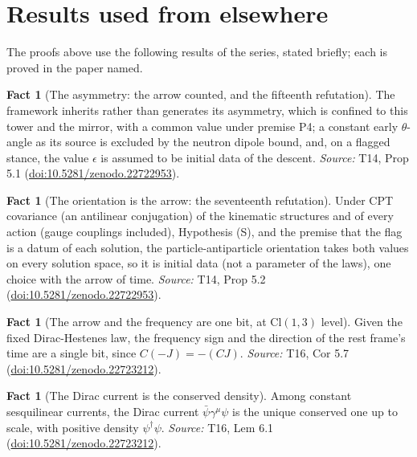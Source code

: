 \documentclass[11pt]{article}
\theoremstyle{definition}
\newtheorem{fact}[theorem]{Fact}
\theoremstyle{plain}
\providecommand{\Cl}{}\renewcommand{\Cl}{\mathrm{Cl}}
\begin{document}
\section{Results used from elsewhere}
The proofs above use the following results of the series, stated briefly; each is proved in the paper named.

\begin{fact}[The asymmetry: the arrow counted, and the fifteenth refutation]\label{c:dark-matter.asymmetry-arrow-counted-fifteenth-refutation}
The framework inherits rather than generates its asymmetry, which is confined to this tower and the mirror, with a common value under premise P4; a constant early $\theta$-angle as its source is excluded by the neutron dipole bound, and, on a flagged stance, the value $\epsilon$ is assumed to be initial data of the descent.
\emph{Source:} T14, Prop 5.1 (\href{https://doi.org/10.5281/zenodo.22722953}{doi:10.5281/zenodo.22722953}).
\end{fact}

\begin{fact}[The orientation is the arrow: the seventeenth refutation]\label{c:dark-matter.orientation-arrow-seventeenth-refutation}
Under CPT covariance (an antilinear conjugation) of the kinematic structures and of every action (gauge couplings included), Hypothesis (S), and the premise that the flag is a datum of each solution, the particle-antiparticle orientation takes both values on every solution space, so it is initial data (not a parameter of the laws), one choice with the arrow of time.
\emph{Source:} T14, Prop 5.2 (\href{https://doi.org/10.5281/zenodo.22722953}{doi:10.5281/zenodo.22722953}).
\end{fact}

\begin{fact}[The arrow and the frequency are one bit, at $\Cl(1,3)$ level]\label{c:one-relation.arrow-frequency-are-one-bit-level}
Given the fixed Dirac-Hestenes law, the frequency sign and the direction of the rest frame's time are a single bit, since $C(-J) = -(CJ)$.
\emph{Source:} T16, Cor 5.7 (\href{https://doi.org/10.5281/zenodo.22723212}{doi:10.5281/zenodo.22723212}).
\end{fact}

\begin{fact}[The Dirac current is the conserved density]\label{c:one-relation.dirac-current-conserved-density}
Among constant sesquilinear currents, the Dirac current $\bar{\psi}\gamma^{\mu}\psi$ is the unique conserved one up to scale, with positive density $\psi^{\dagger}\psi$.
\emph{Source:} T16, Lem 6.1 (\href{https://doi.org/10.5281/zenodo.22723212}{doi:10.5281/zenodo.22723212}).
\end{fact}
\end{document}
